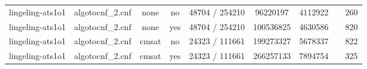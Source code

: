 \begin{appendices}
\begin{table}[p]
\begin{center}
\begin{tabular}{l|cccccccc}
  lingeling-ats1o1               & algotocnf\_2.cnf               & none       & no    & 48704 / 254210 & 96220197  & 4112922   &            & 260 \\ %
  lingeling-ats1o1               & algotocnf\_2.cnf               & none       & yes   & 48704 / 254210 & 100536825 & 4630586   &            & 820 \\ %
  lingeling-ats1o1               & algotocnf\_2.cnf               & cmsat      & no    & 24323 / 111661 & 199273327 & 5678337   &            & 822 \\ %
  lingeling-ats1o1               & algotocnf\_2.cnf               & cmsat      & yes   & 24323 / 111661 & 266257133 & 7894754   &            & 325 \\ %
    \end{tabular}
  \end{center}
\end{table}

\newpage


\end{appendices}
